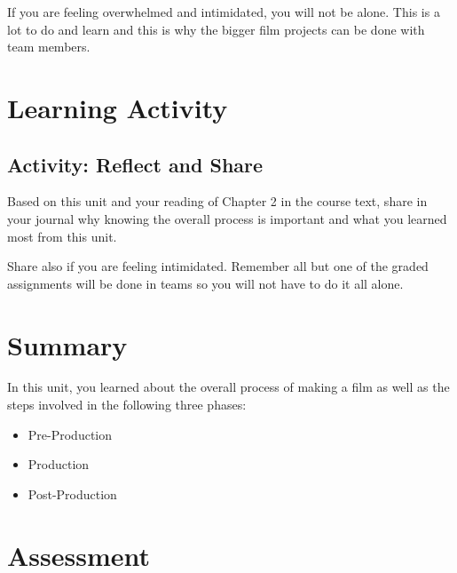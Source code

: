 \documentclass[
]{book}
\providecommand{\tightlist}{%
  \setlength{\itemsep}{0pt}\setlength{\parskip}{0pt}}
\begin{document}
If you are feeling overwhelmed and intimidated, you will not be alone. This is a lot to do and learn and this is why the bigger film projects can be done with team members.

\hypertarget{learning-activity}{%
\section{Learning Activity}\label{learning-activity}}

\hypertarget{activity-reflect-and-share}{%
\subsection*{Activity: Reflect and Share}\label{activity-reflect-and-share}}

\begin{reflect}
Based on this unit and your reading of Chapter 2 in the course text, share in your journal why knowing the overall process is important and what you learned most from this unit.

Share also if you are feeling intimidated. Remember all but one of the graded assignments will be done in teams so you will not have to do it all alone.
\end{reflect}

\hypertarget{summary-1}{%
\section*{Summary}\label{summary-1}}

In this unit, you learned about the overall process of making a film as well as the steps involved in the following three phases:

\begin{itemize}
\tightlist
\item
  Pre-Production\\
\item
  Production\\
\item
  Post-Production
\end{itemize}

\hypertarget{assessment-3}{%
\section*{Assessment}\label{assessment-3}}
\end{document}
